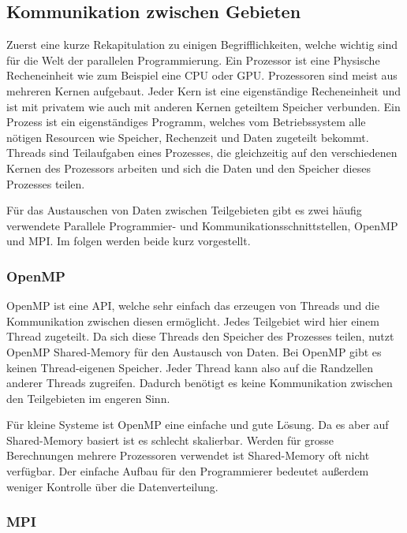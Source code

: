 %
%
%
%
\subsection{Kommunikation zwischen Gebieten
\label{parallelisierung:sub:Interprozess}}
Zuerst eine kurze Rekapitulation zu einigen Begrifflichkeiten, welche wichtig sind für die Welt der parallelen Programmierung.
Ein Prozessor ist eine Physische Recheneinheit wie zum Beispiel eine CPU oder GPU.
Prozessoren sind meist aus mehreren Kernen aufgebaut.
Jeder Kern ist eine eigenständige Recheneinheit und ist mit privatem wie auch mit anderen Kernen geteiltem Speicher verbunden.
Ein Prozess ist ein eigenständiges Programm, welches vom Betriebssystem alle nötigen Resourcen wie Speicher, Rechenzeit und Daten zugeteilt bekommt.
Threads sind Teilaufgaben eines Prozesses, die gleichzeitig auf den verschiedenen Kernen des Prozessors arbeiten und sich die Daten und den Speicher dieses Prozesses teilen.

Für das Austauschen von Daten zwischen Teilgebieten gibt es zwei häufig verwendete Parallele Programmier- und Kommunikationsschnittstellen, OpenMP und MPI.
Im folgen werden beide kurz vorgestellt.

\subsubsection{OpenMP}
OpenMP ist eine API, welche sehr einfach das erzeugen von Threads und die Kommunikation zwischen diesen ermöglicht.
Jedes Teilgebiet wird hier einem Thread zugeteilt. 
Da sich diese Threads den Speicher des Prozesses teilen, nutzt OpenMP Shared-Memory für den Austausch von Daten.
Bei OpenMP gibt es keinen Thread-eigenen Speicher.
Jeder Thread kann also auf die Randzellen anderer Threads zugreifen.
Dadurch benötigt es keine Kommunikation zwischen den Teilgebieten im engeren Sinn.

Für kleine Systeme ist OpenMP eine einfache und gute Lösung.
Da es aber auf Shared-Memory basiert ist es schlecht skalierbar.
Werden für grosse Berechnungen mehrere Prozessoren verwendet ist Shared-Memory oft nicht verfügbar.
Der einfache Aufbau für den Programmierer bedeutet außerdem weniger Kontrolle über die Datenverteilung.

\subsubsection{MPI}
